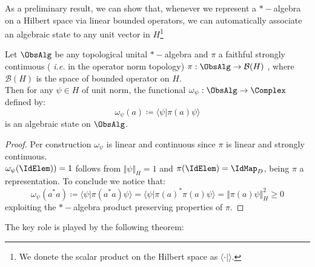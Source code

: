 \documentclass[Main]{subfiles}
\begin{document}
				As a preliminary result, we can show that, whenever we represent a $\ast-$algebra on a Hilbert space via linear bounded operators, we can automatically associate an algebraic state to any unit vector in $H$\footnote{We donete the scalar product on the Hilbert space as $\langle \cdot \vert \rangle$.}
				\begin{proposition}
					Let $\ObsAlg$ be any topological unital $\ast-$algebra and $\pi$ a faithful strongly continuous ( \textit{i.e.} in the operator norm topology) $\pi: \ObsAlg \rightarrow \mathcal{B}(H)$ , where $ \mathcal{B}(H)$ is the space of bounded operator on $H$.\\
					Then for any $\psi \in H$ of unit norm, the functional $\omega_\psi : \ObsAlg \rightarrow \Complex$ defined by:
					\begin{displaymath}
						\omega_\psi ( a) \coloneqq  \langle \psi \vert \pi( a ) \psi \rangle
					\end{displaymath}
					is an algebraic state on $\ObsAlg$.
				\end{proposition}
				\begin{proof}
				Per construction $\omega_\psi$ is linear and continuous since $\pi$ is linear and strongly continuous.\\
				$\omega_\psi (\IdElem) )= 1$ follows from $\Vert \psi \Vert_H = 1$  and $\pi(\IdElem)= \IdMap_D$, being $\pi$ a representation. To conclude we notice that:
				\begin{displaymath}
					\omega_\psi ( a^* a) \coloneqq \langle \psi \vert \pi( a^* a) \psi \rangle = \langle \psi | \pi(a)^* \pi(a) \psi \rangle = \Vert \pi(a)\psi \Vert^2_H \geq 0
				\end{displaymath}
					exploiting the $\ast-$algebra product preserving properties of $\pi$.
				\end{proof}
				The key role is played by the following theorem:
\end{document}

